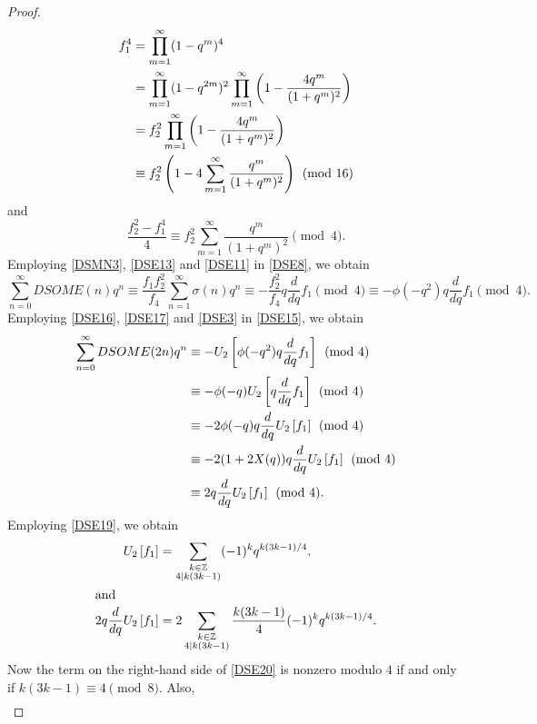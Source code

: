 \documentclass[12pt]{article}
\numberwithin{equation}{section}
\theoremstyle{definition}
\theoremstyle{remark}
\numberwithin{equation}{section}
\begin{document}
\begin{proof}
\begin{align}
f_1^4
&=
\prod_{m=1}^{\infty}(1-q^m)^4
\notag\\
&=
\prod_{m=1}^{\infty}(1-q^{2m})^2
\prod_{m=1}^{\infty}
\left(
1-\dfrac{4q^m}{(1+q^m)^2}
\right)
\notag\\
&=
f_2^2
\prod_{m=1}^{\infty}
\left(
1-\dfrac{4q^m}{(1+q^m)^2}
\right)
\notag\\
&\label{DSE10}\equiv
f_2^2
\left(
1-4\sum_{m=1}^{\infty}
\dfrac{q^m}{(1+q^m)^2}
\right)
\pmod{16}
\end{align}
and 
\begin{equation}\label{DSE11}
\dfrac{f_2^2-f_1^4}{4}
\equiv
f_2^2
\sum_{m=1}^{\infty}
\dfrac{q^m}{(1+q^m)^2}
\pmod4.
\end{equation}
Employing \eqref{DSMN3}, \eqref{DSE13} and \eqref{DSE11}
 in \eqref{DSE8}, we obtain
\begin{equation}\label{DSE15}
\sum_{n=0}^{\infty}DSOME(n)q^n
\equiv
\dfrac{f_1f_2^2}{f_4}
\sum_{n=1}^{\infty}\sigma(n)q^n
\equiv
-\dfrac{f_2^2}{f_4}q\dfrac{d}{dq} f_1\pmod4
\equiv
-\phi(-q^2)q\dfrac{d}{dq} f_1
\pmod4.
\end{equation}
Employing \eqref{DSE16}, \eqref{DSE17} and \eqref{DSE3} 
 in \eqref{DSE15}, we obtain
\begin{align}
\sum_{n=0}^{\infty}DSOME(2n)q^n
&\equiv
-U_2\left[
\phi(-q^2)q\dfrac{d}{dq}f_1
\right]
\pmod4
\notag\\
&\equiv
-\phi(-q)U_2\left[q\dfrac{d}{dq} f_1\right]\pmod4
\notag\\
&\equiv
-2\phi(-q)q\dfrac{d}{dq} U_2\left[f_1\right]\pmod4
\notag\\
&\equiv
-2(1+2X(q))q\dfrac{d}{dq} U_2\left[f_1\right]\pmod4
\notag\\
&\label{DSE18}\equiv
2q\dfrac{d}{dq}U_2\left[f_1\right]
\pmod4.
\end{align}
Employing \eqref{DSE19}, we obtain
\begin{align}
U_2\left[f_1\right]
&=
\sum_{\substack{k\in\mathbb Z\\4\mid k(3k-1)}}
(-1)^kq^{k(3k-1)/4},
\notag\\\intertext{and}
2q\dfrac{d}{dq} U_2\left[f_1\right]
&\label{DSE20}=
2\sum_{\substack{k\in\mathbb Z\\4\mid k(3k-1)}}
\dfrac{k(3k-1)}{4}
(-1)^kq^{k(3k-1)/4}.
\end{align}
Now the term on the right-hand side of \eqref{DSE20} is nonzero modulo $4$
if and only if 
$k(3k-1)\equiv4\pmod8.$
Also, 
$$\begin{array}{c|cccccccc}

\end{array}$$
\end{proof}
\end{document}
